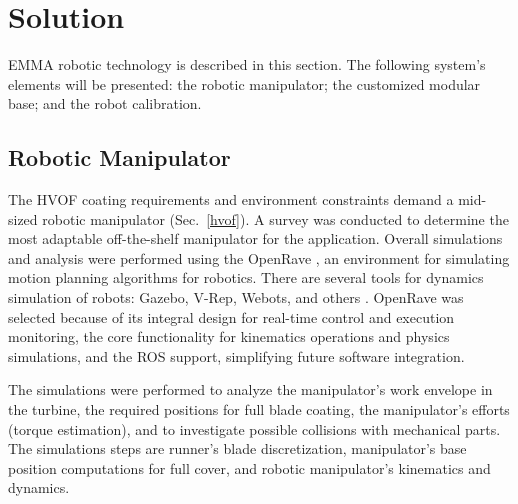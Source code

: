 \section{Solution}\label{solution}


EMMA robotic technology is described in this section. The following system's
elements will be presented: the robotic manipulator; the customized modular
base; and the robot calibration. 

\subsection{Robotic Manipulator}\label{manipulator}
The HVOF coating requirements and environment constraints demand a mid-sized
robotic manipulator (Sec.~\ref{hvof}). A survey was conducted to determine the
most adaptable off-the-shelf manipulator for the application. Overall simu\-lations and analysis were
performed using the OpenRave \cite{diankov2008openrave}, an environment for
simulating motion planning algorithms for robotics. There are several tools for
dynamics simulation of robots: Gazebo, V-Rep, Webots, and others%
. OpenRave was selected because of its integral design for real-time control
and execution monitoring, the core functionality for kinematics operations and
physics simulations, and the ROS support, simplifying future software
integration.

The simulations were performed to analyze the manipulator's work envelope in
the turbine, the required positions for full blade coating, the
manipulator's efforts (torque estimation), and to investigate possible
collisions with mechanical parts. The simulations steps are runner's
blade discretization, manipulator's base position computations for full cover,
and robotic manipulator's kinematics and dynamics.

